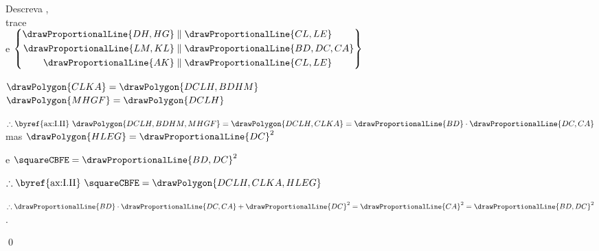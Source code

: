 \documentclass[booklanguage=brazilian]{byrnebook}
\begin{document}
\begin{center}
Descreva  ,\\
trace \\
e $\left\{
	\begin{aligned}
		\drawProportionalLine{DH,HG} & \parallel \drawProportionalLine{CL,LE} \\
		\drawProportionalLine{LM,KL} & \parallel \drawProportionalLine{BD,DC,CA} \\
		\drawProportionalLine{AK} & \parallel \drawProportionalLine{CL,LE}\\
	\end{aligned}
\right\}$ 

$\drawPolygon{CLKA} = \drawPolygon{DCLH,BDHM}$ \\
$\drawPolygon{MHGF} = \drawPolygon{DCLH}$ 

$\therefore \mbox{\byref{ax:I.II} } \drawPolygon{DCLH,BDHM,MHGF} = \drawPolygon{DCLH,CLKA} = \drawProportionalLine{BD} \cdot \drawProportionalLine{DC,CA}$
mas $\drawPolygon{HLEG} = \drawProportionalLine{DC}^2$ 

e $\squareCBFE = \drawProportionalLine{BD,DC}^2$ \byref{\constref}

$\therefore \mbox{\byref{ax:I.II} } \squareCBFE = \drawPolygon{DCLH,CLKA,HLEG}$

$\therefore \drawProportionalLine{BD} \cdot \drawProportionalLine{DC,CA} + \drawProportionalLine{DC}^2 = \drawProportionalLine{CA}^2 = \drawProportionalLine{BD,DC}^2$.
\end{center}

\qed
\end{document}
